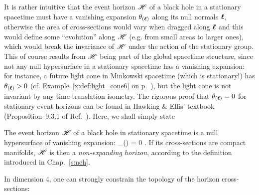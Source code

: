 It is rather intuitive that the event horizon $\mathscr{H}$ of a black hole in
a stationary spacetime must have a vanishing expansion $\theta_{(\bm{\ell})}$ along its null
normals $\bm{\ell}$, otherwise the area of cross-sections would vary when dragged
along $\bm{\ell}$ and this would define some ``evolution'' along $\mathscr{H}$ (e.g. from small areas
to larger ones),
which would break the invariance of $\mathscr{H}$ under the action of the stationary group.
This of course results from $\mathscr{H}$ being part of the global spacetime structure,
since not any null hypersurface in a stationary spacetime has a vanishing
expansion: for instance, a future light cone in Minkowski spacetime
(which is stationary!) has $\theta_{(\bm{\ell})}>0$
(cf. Example~\ref{x:def:light_cone6} on p.~\pageref{x:def:light_cone6}),
but the light cone is not invariant by any time translation isometry.
The rigorous proof that $\theta_{(\bm{\ell})} = 0$
for stationary event horizons can be found in Hawking \& Ellis' textbook
(Proposition~9.3.1 of Ref.~\cite{HawkiE73}).
Here, we shall simply state
\begin{prop}
\label{p:sta:hor_non_expanding}
The event horizon $\mathscr{H}$ of a black hole in stationary spacetime
is a null hypersurface of vanishing expansion:
\be
    \theta_{(\wl)} = 0 .
\ee
If its cross-sections are compact manifolds, $\mathscr{H}$ is then a \emph{non-expanding horizon},
according to the definition introduced in Chap.~\ref{s:neh}.
\end{prop}

In dimension 4, one can strongly constrain the topology of the horizon cross-sections:

